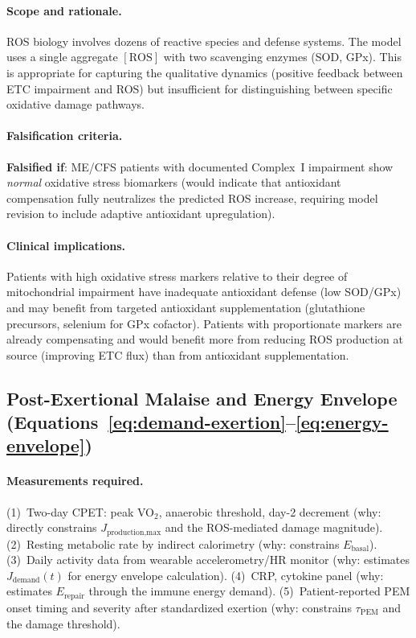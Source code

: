 \paragraph{Scope and rationale.}
ROS biology involves dozens of reactive species and defense systems. The model uses a single aggregate $[\text{ROS}]$ with two scavenging enzymes (SOD, GPx). This is appropriate for capturing the qualitative dynamics (positive feedback between ETC impairment and ROS) but insufficient for distinguishing between specific oxidative damage pathways.

\paragraph{Falsification criteria.}
\textbf{Falsified if}: ME/CFS patients with documented Complex~I impairment show \emph{normal} oxidative stress biomarkers (would indicate that antioxidant compensation fully neutralizes the predicted ROS increase, requiring model revision to include adaptive antioxidant upregulation).

\paragraph{Clinical implications.}
Patients with high oxidative stress markers relative to their degree of mitochondrial impairment have inadequate antioxidant defense (low SOD/GPx) and may benefit from targeted antioxidant supplementation (glutathione precursors, selenium for GPx cofactor). Patients with proportionate markers are already compensating and would benefit more from reducing ROS production at source (improving ETC flux) than from antioxidant supplementation.

\subsection{Post-Exertional Malaise and Energy Envelope (Equations~\ref{eq:demand-exertion}--\ref{eq:energy-envelope})}

\paragraph{Measurements required.}
(1)~Two-day CPET: peak VO$_2$, anaerobic threshold, day-2 decrement (why: directly constrains $J_{\text{production,max}}$ and the ROS-mediated damage magnitude).
(2)~Resting metabolic rate by indirect calorimetry (why: constrains $E_{\text{basal}}$).
(3)~Daily activity data from wearable accelerometry/HR monitor (why: estimates $J_{\text{demand}}(t)$ for energy envelope calculation).
(4)~CRP, cytokine panel (why: estimates $E_{\text{repair}}$ through the immune energy demand).
(5)~Patient-reported PEM onset timing and severity after standardized exertion (why: constrains $\tau_{\text{PEM}}$ and the damage threshold).

